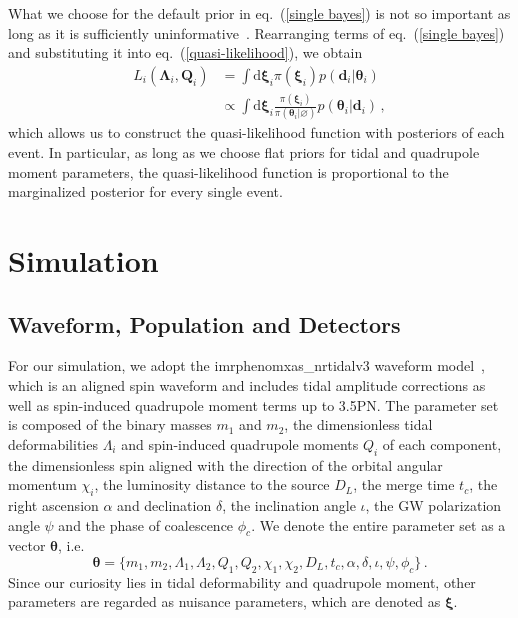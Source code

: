 \documentclass[a4paper,11pt]{article}
\begin{document}
What we choose for the default prior in eq.~(\ref{single bayes}) is not so important as long as it is sufficiently 
uninformative~\cite{Thrane:2018qnx}. Rearranging terms of eq.~(\ref{single bayes}) and substituting it into 
eq.~(\ref{quasi-likelihood}), we obtain
\begin{equation}
\label{quasi-posterior}
\begin{aligned}
    L_i(\bm{\Lambda}_i,\bm{Q}_i) &= \int \text{d}\bm{\xi}_i \pi(\bm{\xi}_i)p(\bm{d}_i|\bm{\theta}_i) \\
    &\propto \int \text{d}\bm{\xi}_i \frac{\pi(\bm{\xi}_i)}{\pi(\bm{\theta}_i|\varnothing)}p(\bm{\theta}_i|\bm{d}_i)\,,
\end{aligned}  
\end{equation}
which allows us to construct the quasi-likelihood function with posteriors of each event. In particular, as long as 
we choose flat priors for tidal and quadrupole moment parameters, the quasi-likelihood function is proportional to 
the marginalized posterior for every single event.


\section{Simulation}
\label{sec3}

\subsection{Waveform, Population and Detectors}
\label{sec3_1}

For our simulation, we adopt the {\sc imrphenomxas\_nrtidalv3} waveform model~\cite{Abac:2023ujg}, 
which is an aligned spin waveform and includes tidal amplitude corrections as well as spin-induced quadrupole moment terms up to 3.5PN. 
The parameter set is composed of the binary masses $m_1$ and $m_2$, the dimensionless tidal deformabilities $\Lambda_i$ 
and spin-induced quadrupole moments $Q_i$ of each component, the dimensionless spin aligned with the direction of the 
orbital angular momentum $\chi_i$, the luminosity distance to the source $D_L$, the merge time $t_c$, the right ascension 
$\alpha$ and declination $\delta$, the inclination angle $\iota$, the GW polarization angle $\psi$ and the phase of 
coalescence $\phi_c$. We denote the entire parameter set as a vector $\bm{\theta}$, i.e.
\begin{equation}
\label{parameter set}
\bm{\theta} = \{m_1,m_2,\Lambda_1,\Lambda_2,Q_1,Q_2,\chi_1,\chi_2,D_L,t_c,\alpha,\delta,\iota,\psi,\phi_c\}\,.
\end{equation}
Since our curiosity lies in tidal deformability and quadrupole moment, other parameters are regarded as nuisance parameters, 
which are denoted as $\bm{\xi}$.
\end{document}
